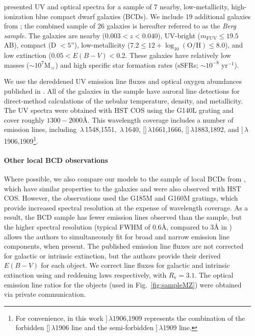 \documentclass[preprint2]{aastex62}
\newcommand{\oiii}{[\ion{O}{3}]}
\newcommand{\heii}{\ion{He}{2}}
\newcommand{\civ}{\ion{C}{4}}
\newcommand{\SiuIII}{[\ion{Si}{3}]}
\newcommand{\ciii}{\ion{C}{3}]}
\newcommand\Msun{\ensuremath{\mathrm{M_{\sun}}}\xspace}
\newcommand{\logten}{\ensuremath{\log_{10}}}
\newcommand{\logOH}{\ensuremath{\logten (\mathrm{O}/\mathrm{H})}\xspace}
\newcommand{\ang}{\ensuremath{\mbox{\AA}}\xspace}
\begin{document}
\citet{Berg+2016} presented UV and optical spectra for a sample of 7 nearby, low-metallicity, high-ionization blue compact dwarf galaxies (BCDs). We include 19 additional galaxies from \citet{Berg+2019}; the combined sample of 26 galaxies is hereafter referred to as the \emph{Berg sample}. The galaxies are nearby ($0.003 < z < 0.040$), UV-bright ($m_{\mathrm{FUV}} \leq 19.5$ AB), compact (D $< 5$''), low-metallicity ($7.2 \leq 12 + \logOH \leq 8.0$), and low extinction ($0.05 < E(B-V) < 0.2$. These galaxies have relatively low masses (${\sim}10^7$\Msun) and high specific star formation rates (sSFRs; ${\sim}10^{-8}$ yr$^{-1}$). 

We use the dereddened UV emission line fluxes and optical oxygen abundances published in \citet{Berg+2016, Berg+2019}. All of the galaxies in the sample have auroral line detections for direct-method calculations of the nebular temperature, density, and metallicity. The UV spectra were obtained with HST COS using the G140L grating and cover roughly $1300-2000$\ang. This wavelength coverage includes a number of emission lines, including \civ$\,\lambda$\,1548,1551, \heii$\,\lambda$\,1640, \oiii$\,\lambda$1661,1666, \SiuIII$\,\lambda$1883,1892, and \ciii $\,\lambda$1906,1909\footnote{For convenience, in this work \ciii $\,\lambda$1906,1909 represents the combination of the forbidden []$\,\lambda$1906 line and the semi-forbidden ]$\,\lambda$1909 line.}.

\paragraph{Other local BCD observations} Where possible, we also compare our models to the sample of local BCDs from \citet{Senchyna+2017, Senchyna+2019}, which have similar properties to the \citet{Berg+2016} galaxies and were also observed with HST COS. However, the \citet{Senchyna+2017} observations used the G185M and G160M gratings, which provide increased spectral resolution at the expense of wavelength coverage. As a result, the \citet{Senchyna+2017} BCD sample has fewer emission lines observed than the \citet{Berg+2016} sample, but the higher spectral resolution (typical FWHM of 0.6\ang, compared to 3\ang in \citealt{Berg+2016}) allows the authors to simultaneously fit for broad and narrow emission line components, when present. The published emission line fluxes are not corrected for galactic or intrinsic extinction, but the authors provide their derived $E(B-V)$ for each object. We correct line fluxes for galactic and intrinsic extinction using  \citet{Fitzpatrick+1999} and \citet{Cardelli+1989} reddening laws respectively, with $R_{\mathrm{v}} = 3.1$. The optical emission line ratios for the \citet{Senchyna+2019} objects (used in Fig.~\ref{fig:sampleMZ}) were obtained via private communication.
\end{document}
